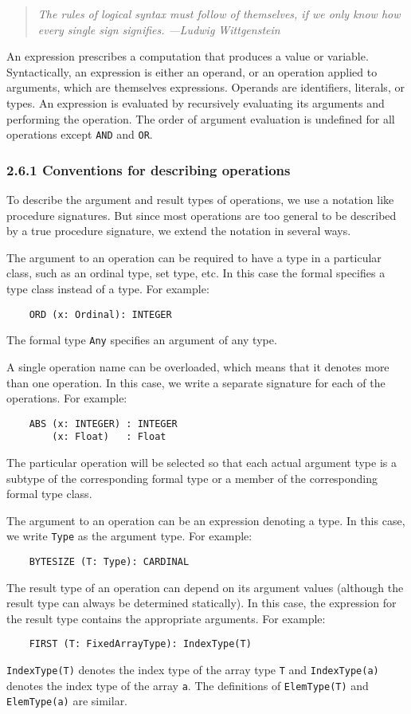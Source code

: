 \documentclass[10pt]{article}
\begin{document}
\begin{quote}
  \emph{The rules of logical syntax must follow of themselves, if we only
    know how every single sign signifies.  ---Ludwig Wittgenstein}
\end{quote}

An expression prescribes a computation that produces a value or variable.
Syntactically, an expression is either an operand, or an operation applied to
arguments, which are themselves expressions.  Operands are identifiers,
literals, or types.  An expression is evaluated by recursively evaluating its
arguments and performing the operation.  The order of argument evaluation is
undefined for all operations except \verb|AND| and \verb|OR|.

\subsubsection*{2.6.1 Conventions for describing operations}

To describe the argument and result types of operations, we use a notation
like procedure signatures.  But since most operations are too general to be
described by a true procedure signature, we extend the notation in several
ways.

The argument to an operation can be required to have a type in a particular
class, such as an ordinal type, set type, etc.  In this case the formal
specifies a type class instead of a type.  For example:
\begin{verbatim}
    ORD (x: Ordinal): INTEGER
\end{verbatim}
The formal type \verb|Any| specifies an argument of any type.

A single operation name can be overloaded, which means that it denotes more
than one operation.  In this case, we write a separate signature for each of
the operations.  For example:
\begin{verbatim}
    ABS (x: INTEGER) : INTEGER
        (x: Float)   : Float
\end{verbatim}
The particular operation will be selected so that each actual argument type is
a subtype of the corresponding formal type or a member of the corresponding
formal type class.

The argument to an operation can be an expression denoting a type.  In this
case, we write \verb|Type| as the argument type.  For example:
\begin{verbatim}
    BYTESIZE (T: Type): CARDINAL
\end{verbatim}
The result type of an operation can depend on its argument values (although
the result type can always be determined statically).  In this case, the
expression for the result type contains the appropriate arguments.  For
example:
\begin{verbatim}
    FIRST (T: FixedArrayType): IndexType(T)
\end{verbatim}
\verb|IndexType(T)| denotes the index type of the array type \verb|T| and
\verb|IndexType(a)| denotes the index type of the array \verb|a|.  The
definitions of \verb|ElemType(T)| and \verb|ElemType(a)| are similar.
\end{document}
